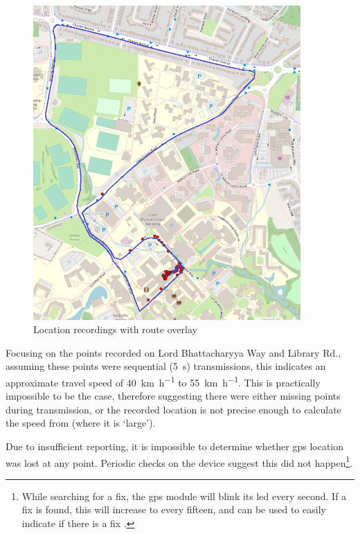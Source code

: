 \begin{figure}[htb!]
    \centering
    \includegraphics[height=12cm]{../figures/maps/test2 overlay.png}
    \caption[Distance test two overlay]{Location recordings with route overlay}
    \label{fig:dtest2}
\end{figure}


Focusing on the points recorded on Lord Bhattacharyya Way and Library Rd.,
assuming these points were sequential (\qty{5}{\s}) transmissions, this indicates an 
approximate travel speed of \qty{40}{\km\per\hour} to \qty{55}{\km\per\hour}. This 
is practically impossible to be the case, therefore suggesting there were either missing points
during transmission, or the recorded location is not precise enough to calculate 
the speed from (where it is `large'). 

Due to insufficient reporting, it is impossible to determine whether \acrshort{gps} location was
lost at any point. Periodic checks on the device suggest this did not happen\footnote{
    While searching for a fix, the \acrshort{gps} module will blink its \acrshort{led} every second.
    If a fix is found, this will increase to every fifteen, and can be used to easily indicate if 
    there is a fix \cite{adafruit:gps}. 
}.

